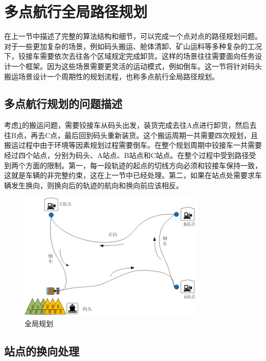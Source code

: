 \documentclass[master,academic]{ysuthesis} %
\begin{document}
	\section{多点航行全局路径规划}
	在上一节中描述了完整的算法结构和细节，可以完成一个点对点的路径规划问题。对于一些更加复杂的场景，例如码头搬运、舱体清卸、矿山运料等多种复杂的工况下，铰接车需要依次去往各个区域规定完成卸货。这样的场景往往需要面向任务设计一个框架。因为这些场景需要更灵活的运动模式，例如倒车。这一节将针对码头搬运场景设计一个周期性的规划流程，也称多点航行全局路径规划。

		\subsection{多点航行规划的问题描述}
		考虑\ref{fig:全局规划}的搬运问题，需要铰接车从码头出发，装货完成去往A点进行卸货，然后去往B点，再去C点，最后回到码头重新装货。这个搬运周期一共需要四次规划，且搬运过程中由于环境等因素规划过程需要倒车。在整个规划周期中铰接车一共需要经过四个站点，分别为码头、A站点、B站点和C站点。在整个过程中受到路径受到两个方面的限制。第一，每一段轨迹的起点的切线方向必须和铰接车保持一致，这就是车辆的非完整约束，这在上一节中已经处理。第二，如果在站点处需要求车辆发生换向，则换向后的轨迹的航向和换向前应该相反。 
		\begin{figure}[!ht]
			\centering
			\includegraphics[width=0.8\textwidth]{全局规划.png}
			\caption{全局规划}
			\label{fig:全局规划}
		\end{figure}

		\subsection{站点的换向处理}
		
\end{document}
